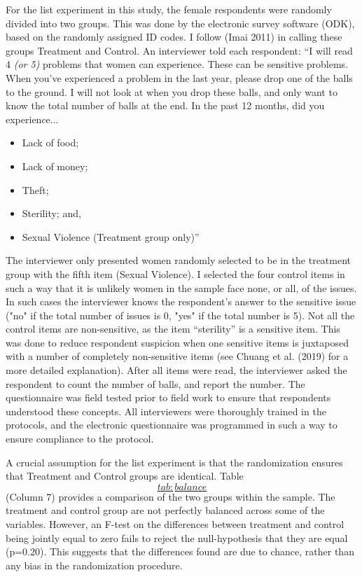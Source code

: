 \documentclass[
]{article}
\begin{document}
For the list experiment in this study, the female respondents were
randomly divided into two groups. This was done by the electronic survey
software (ODK), based on the randomly assigned ID codes. I follow (Imai
2011) in calling these groups Treatment and Control. An interviewer told
each respondent: ``I will read 4 \emph{(or 5)} problems that women can
experience. These can be sensitive problems. When you've experienced a
problem in the last year, please drop one of the balls to the ground. I
will not look at when you drop these balls, and only want to know the
total number of balls at the end. In the past 12 months, did you
experience...

\begin{itemize}
\item
  Lack of food;
\item
  Lack of money;
\item
  Theft;
\item
  Sterility; and,
\item
  Sexual Violence (Treatment group only)''
\end{itemize}

The interviewer only presented women randomly selected to be in the
treatment group with the fifth item (Sexual Violence). I selected the
four control items in such a way that it is unlikely women in the sample
face none, or all, of the issues. In such cases the interviewer knows
the respondent's answer to the sensitive issue ("no" if the total number
of issues is 0, "yes" if the total number is 5). Not all the control
items are non-sensitive, as the item ``sterility'' is a sensitive item.
This was done to reduce respondent suspicion when one sensitive items is
juxtaposed with a number of completely non-sensitive items (see Chuang
et al. (2019) for a more detailed explanation). After all items were
read, the interviewer asked the respondent to count the number of balls,
and report the number. The questionnaire was field tested prior to field
work to ensure that respondents understood these concepts. All
interviewers were thoroughly trained in the protocols, and the
electronic questionnaire was programmed in such a way to ensure
compliance to the protocol.

A crucial assumption for the list experiment is that the randomization
ensures that Treatment and Control groups are identical. Table
\hyperref[tab:balance]{\[tab:balance\]} (Column 7) provides a comparison
of the two groups within the sample. The treatment and control group are
not perfectly balanced across some of the variables. However, an F-test
on the differences between treatment and control being jointly equal to
zero fails to reject the null-hypothesis that they are equal (p=0.20).
This suggests that the differences found are due to chance, rather than
any bias in the randomization procedure.
\end{document}
